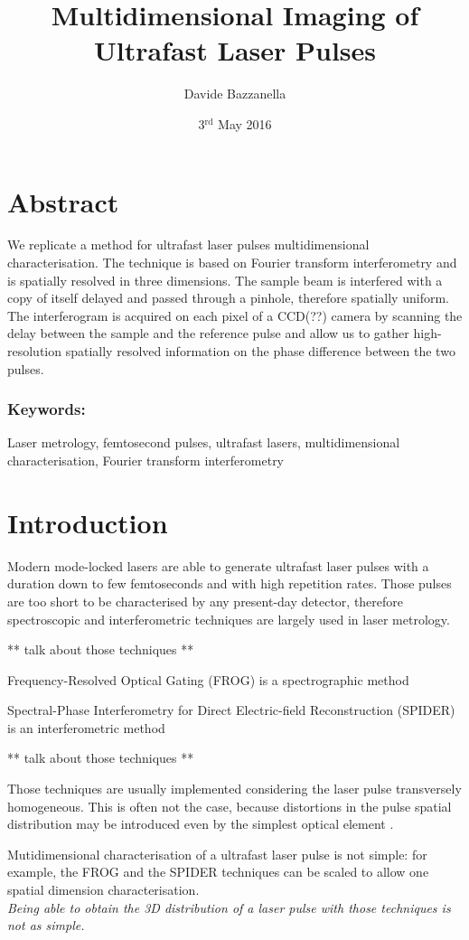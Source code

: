 \documentclass[12pt,a4paper,twoside]{article}
\author{Davide Bazzanella}
\title{Multidimensional Imaging of Ultrafast Laser Pulses}
\date{3$^{\mathrm{rd}}$ May 2016}
\begin{document}

\cleardoublepage
\section*{Abstract}
We replicate a method for ultrafast laser pulses multidimensional characterisation.
The technique is based on Fourier transform interferometry and is spatially resolved in three dimensions.
The sample beam is interfered with a copy of itself delayed and passed through a pinhole, therefore spatially uniform.
The interferogram is acquired on each pixel of a CCD(??) camera by scanning the delay between the sample and the reference pulse and allow us to gather high-resolution spatially resolved information on the phase difference between the two pulses.
\subsubsection*{Keywords:} Laser metrology, femtosecond pulses, ultrafast lasers, multidimensional characterisation, Fourier transform interferometry
\cleardoublepage
\tableofcontents

\cleardoublepage
{}
\section{Introduction}
Modern mode-locked lasers are able to generate ultrafast laser pulses with a duration down to few femtoseconds \cite{tamura93,schriever14,yu30} and with high repetition rates.
Those pulses are too short to be characterised by any present-day detector, therefore spectroscopic and interferometric techniques are largely used in laser metrology.

** talk about those techniques **

Frequency-Resolved Optical Gating (FROG) is a spectrographic method

Spectral-Phase Interferometry for Direct Electric-field Reconstruction (SPIDER) is an interferometric method

** talk about those techniques **

Those techniques are usually implemented considering the laser pulse transversely homogeneous.
This is often not the case, because distortions in the pulse spatial distribution may be introduced even by the simplest optical element \cite{bor}.

Mutidimensional characterisation of a ultrafast laser pulse is not simple: for example, the FROG and the SPIDER techniques can be scaled to allow one spatial dimension characterisation.\\
\textit{Being able to obtain the 3D distribution of a laser pulse with those techniques is not as simple.}
\end{document}
